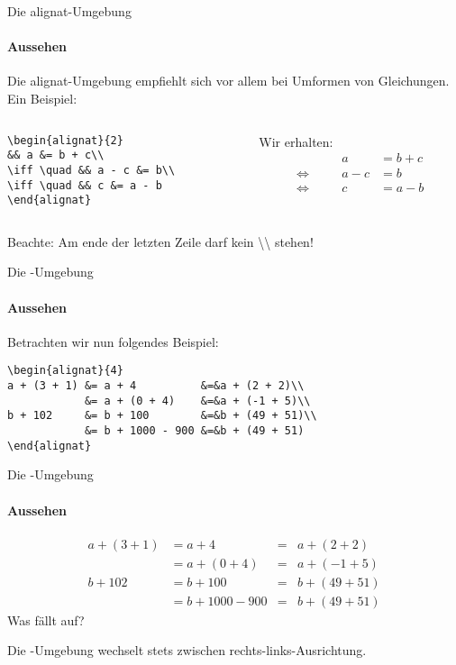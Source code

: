 \begin{frame}[fragile]{Die \textcolor{umg}{alignat}-Umgebung}
\framesubtitle{Aussehen} 
Die \textcolor{umg}{alignat}-Umgebung empfiehlt sich vor allem bei Umformen von Gleichungen. Ein Beispiel:
\begin{columns}
\begin{column}{.5\textwidth}
\begin{codeblock}
\begin{verbatim}
\begin{alignat}{2}
&& a &= b + c\\
\iff \quad && a - c &= b\\
\iff \quad && c &= a - b
\end{alignat}
\end{verbatim}
\end{codeblock}
\end{column}

\begin{column}{.4\textwidth}
Wir erhalten:
\begin{alignat}{2}
&& a &= b + c\\
\iff \quad && a - c &= b\\
\iff \quad && c &= a - b
\end{alignat}
\end{column}
\end{columns}
\pause
Beachte: \alert{Am ende der letzten Zeile darf kein \textbackslash\textbackslash{} stehen!}
\end{frame}

\begin{frame}[fragile]{Die -Umgebung}
\framesubtitle{Aussehen}
Betrachten wir nun folgendes Beispiel: 

\begin{codeblock}
\begin{verbatim}
\begin{alignat}{4}
a + (3 + 1) &= a + 4          &=&a + (2 + 2)\\
            &= a + (0 + 4)    &=&a + (-1 + 5)\\
b + 102     &= b + 100        &=&b + (49 + 51)\\
            &= b + 1000 - 900 &=&b + (49 + 51)
\end{alignat}
\end{verbatim}
\end{codeblock}
\end{frame}

\begin{frame}{Die -Umgebung}
\framesubtitle{Aussehen}
\begin{alignat}{4}
a + (3 + 1) &= a + 4          &=&a + (2 + 2)\\
            &= a + (0 + 4)    &=&a + (-1 + 5)\\
b + 102     &= b + 100        &=&b + (49 + 51)\\
            &= b + 1000 - 900 &=&b + (49 + 51)
\end{alignat}
Was fällt auf?

\medskip
\pause
Die -Umgebung wechselt stets zwischen rechts-links-Ausrichtung.
\end{frame}
